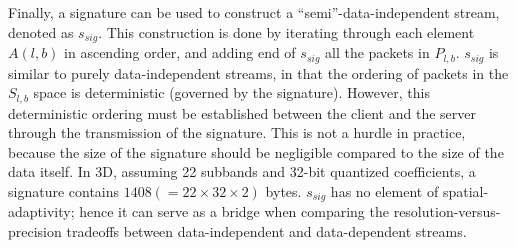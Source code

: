 Finally, a signature can be used to construct a ``semi''-data-independent stream, denoted as
$s_{sig}$. This construction is done by iterating through each element $A(l,b)$ in ascending order, and adding
end of $s_{sig}$ all the packets in $P_{l,b}$. $s_{sig}$ is similar to purely data-independent
streams, in that the ordering of packets in the $S_{l,b}$ space is deterministic (governed by the
signature). However, this deterministic ordering must be established between the client and the
server through the transmission of the signature. This is not a hurdle in practice, because the size
of the signature should be negligible compared to the size of the data itself. In 3D, assuming 22
subbands and 32-bit quantized coefficients, a signature contains $1408 (=22\times 32\times 2)$
bytes. $s_{sig}$ has no element of spatial-adaptivity; hence it can serve as a bridge when comparing
the resolution-versus-precision tradeoffs between data-independent and data-dependent streams.
